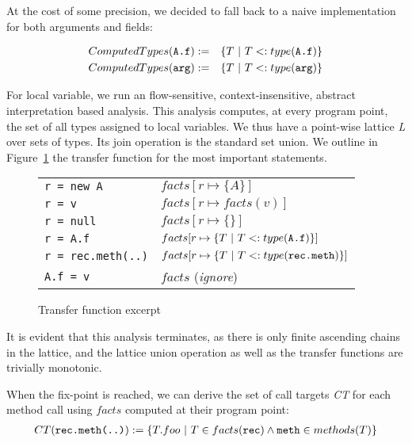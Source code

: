 At the cost of some precision, we decided to fall back to a naive
implementation for both arguments and fields:

\begin{eqnarray}
    ComputedTypes(\verb/A.f/) &:=& \{ T ~|~ T <: type(\verb/A.f/) \} \\
    ComputedTypes(\verb/arg/) &:=& \{ T ~|~ T <: type(\verb/arg/) \}
\end{eqnarray}

For local variable, we run an flow-sensitive, context-insensitive, abstract
interpretation based analysis. This analysis computes, at every program point,
the set of all types assigned to local variables. We thus have a point-wise
lattice \emph{L} over sets of types. Its join operation is the standard set
union. We outline in Figure~\ref{fig:ta:tf} the transfer function for the most
important statements.
\FloatBarrier
\begin{figure}[h]
    \centering

    \begin{tabular}{ | l | l | }
        \hline
        \verb/r = new A/          & $facts[ r \mapsto \{ A \}]$ \\
        \verb/r = v/              & $facts[ r \mapsto facts(v)]$ \\
        \verb/r = null/           & $facts[ r \mapsto \{ \}]$ \\
        \verb/r = A.f/            & $facts[ r \mapsto \{ T ~|~ T <: type(\verb/A.f/)\}]$ \\
        \verb/r = rec.meth(..)/   & $facts[ r \mapsto \{ T ~|~ T <: type(\verb/rec.meth/)\}]$ \\
        \verb/A.f = v/            & $facts$ (\emph{ignore}) \\
        \hline
    \end{tabular}

    \caption{Transfer function excerpt}
    \label{fig:ta:tf}
\end{figure}

It is evident that this analysis terminates, as there is only finite ascending
chains in the lattice, and the lattice union operation as well as the transfer
functions are trivially monotonic.

When the fix-point is reached, we can derive the set of call targets \emph{CT}
for each method call using $facts$ computed at their program point:
\begin{eqnarray}
    CT(\verb/rec.meth(..)/) := \{ T.foo ~|~ T \in facts(\verb/rec/) \land \verb/meth/ \in methods(T) \}
\end{eqnarray}

